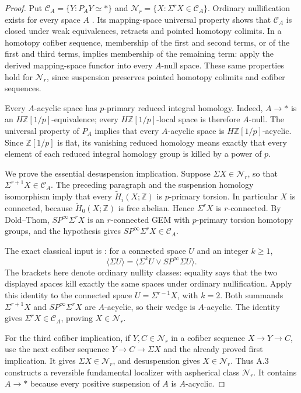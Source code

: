 \begin{proof}
Put $\mathcal C_A=\{Y:P_AY\simeq *\}$ and
$\mathcal N_r=\{X:\Sigma^rX\in\mathcal C_A\}$.
Ordinary nullification exists for every space $A$
\citep[Theorem~1.1]{Bousfield1996ULP}. Its mapping-space universal
property shows that $\mathcal C_A$ is closed under weak equivalences,
retracts and pointed homotopy colimits. In a homotopy cofiber sequence,
membership of the first and second terms, or of the first and third
terms, implies membership of the remaining term: apply the derived
mapping-space functor into every $A$-null space. These same properties
hold for $\mathcal N_r$, since suspension preserves pointed homotopy
colimits and cofiber sequences.

Every $A$-acyclic space has $p$-primary reduced integral homology.
Indeed, $A\to *$ is an $H\mathbb Z[1/p]$-equivalence; every
$H\mathbb Z[1/p]$-local space is therefore $A$-null. The universal
property of $P_A$ implies that every $A$-acyclic space is
$H\mathbb Z[1/p]$-acyclic. Since $\mathbb Z[1/p]$ is flat, its
vanishing reduced homology means exactly that every element of each
reduced integral homology group is killed by a power of $p$.

We prove the essential desuspension implication. Suppose
$\Sigma X\in\mathcal N_r$, so that
$\Sigma^{r+1}X\in\mathcal C_A$. The preceding paragraph and the
suspension homology isomorphism imply that every
$\widetilde H_i(X;\mathbb Z)$ is $p$-primary torsion. In particular
$X$ is connected, because $\widetilde H_0(X;\mathbb Z)$ is free
abelian. Hence $\Sigma^rX$ is $r$-connected. By Dold--Thom,
$SP^\infty\Sigma^rX$ is an $r$-connected GEM with $p$-primary
torsion homotopy groups, and the hypothesis gives
$SP^\infty\Sigma^rX\in\mathcal C_A$.

The exact classical input is \citet[Theorem~3.3]{Bousfield1996ULP}:
for a connected space $U$ and an integer $k\geq1$,
\[
 \langle\Sigma U\rangle
  =\langle\Sigma^kU\vee SP^\infty\Sigma U\rangle.
\]
The brackets here denote ordinary nullity classes: equality says that
the two displayed spaces kill exactly the same spaces under ordinary
nullification. Apply this identity to the connected space
$U=\Sigma^{r-1}X$, with $k=2$. Both summands
$\Sigma^{r+1}X$ and $SP^\infty\Sigma^rX$ are $A$-acyclic, so their
wedge is $A$-acyclic. The identity gives
$\Sigma^rX\in\mathcal C_A$, proving $X\in\mathcal N_r$.

For the third cofiber implication, if $Y,C\in\mathcal N_r$ in a
cofiber sequence $X\to Y\to C$, use the next cofiber sequence
$Y\to C\to\Sigma X$ and the already proved first implication.
It gives $\Sigma X\in\mathcal N_r$, and desuspension gives
$X\in\mathcal N_r$. Thus A.3 constructs a reversible fundamental
localizer with aspherical class $\mathcal N_r$. It contains $A\to *$
because every positive suspension of $A$ is $A$-acyclic.


\end{proof}
